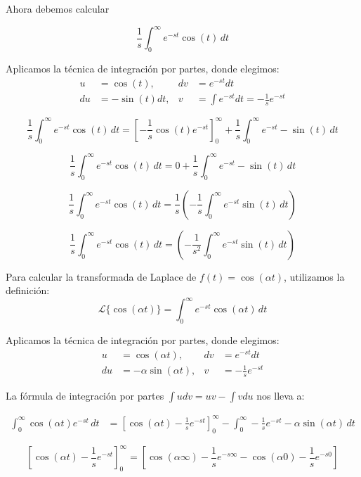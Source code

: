 \documentclass{article}
\begin{document}
Ahora debemos calcular

\[
    \frac{1}{s} \int_{0}^{\infty} e^{-st} \cos(t) \, dt
\]

Aplicamos la técnica de integración por partes, donde elegimos:
\begin{align*}
    u  & = \cos(t),     & dv & = e^{-st} dt                            \\
    du & = -\sin(t) dt, & v  & = \int e^{-st} dt = -\frac{1}{s}e^{-st}
\end{align*}

\[
    \frac{1}{s} \int_{0}^{\infty} e^{-st} \cos(t) \, dt = \left[-\frac{1}{s} \cos(t) e^{-st}\right]_{0}^{\infty} + \frac{1}{s} \int_{0}^{\infty} e^{-st} - \sin(t) \, dt
\]

\[
    \frac{1}{s}\int_{0}^{\infty} e^{-st} \cos(t) \, dt = 0 + \frac{1}{s} \int_{0}^{\infty} e^{-st} - \sin(t) \, dt
\]

\[
    \frac{1}{s}\int_{0}^{\infty} e^{-st} \cos(t) \, dt =\frac{1}{s} \left(- \frac{1}{s} \int_{0}^{\infty} e^{-st} \sin(t) \, dt\right)
\]

\[
    \frac{1}{s}\int_{0}^{\infty} e^{-st} \cos(t) \, dt =\left(-\frac{1}{s^2} \int_{0}^{\infty} e^{-st} \sin(t) \, dt\right)
\]

\newpage

Para calcular la transformada de Laplace de \(f(t) = \cos(\alpha t)\), utilizamos la definición:
\[
    \mathcal{L}\{\cos(\alpha t)\} = \int_{0}^{\infty} e^{-st} \cos(\alpha t) \, dt
\]

Aplicamos la técnica de integración por partes, donde elegimos:
\begin{align*}
    u  & = \cos(\alpha t),         & dv & = e^{-st} dt           \\
    du & = -\alpha \sin(\alpha t), & v  & =  -\frac{1}{s}e^{-st}
\end{align*}

La fórmula de integración por partes \(\int u dv = uv - \int v du\) nos lleva a:

\begin{align*}
    \int_{0}^{\infty} \cos(\alpha t) e^{-st} \, dt & = \left[\cos(\alpha t) -\frac{1}{s}e^{-st}\right]_{0}^{\infty} - \int_{0}^{\infty} -\frac{1}{s}e^{-st} - \alpha \sin(\alpha t) \, dt
\end{align*}

\[\left[\cos(\alpha t) -\frac{1}{s}e^{-st}\right]_{0}^{\infty} = \left[\cos(\alpha \infty) -\frac{1}{s}e^{-s\infty} - \cos(\alpha 0) -\frac{1}{s}e^{-s 0}\right]\]
\end{document}
